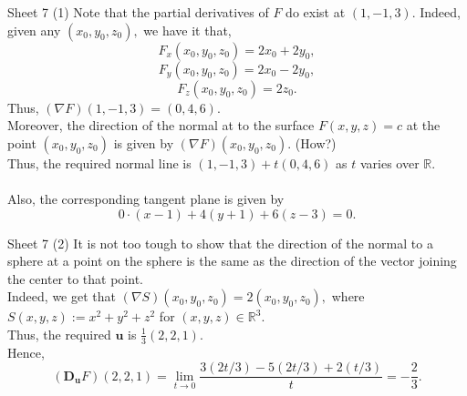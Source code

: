 \documentclass[handout, aspectratio=169]{beamer}
\begin{document}
\begin{frame}{Sheet 7}
	(1) Note that the partial derivatives of $F$ do exist at $(1, -1, 3).$ Indeed, given any $(x_0, y_0, z_0),$ we have it that,
	\[F_x(x_0, y_0, z_0) = 2x_0 + 2y_0,\]
	\[F_y(x_0, y_0, z_0) = 2x_0 - 2y_0,\]
	\[F_z(x_0, y_0, z_0) = 2z_0.\]
	Thus, $(\nabla F)(1, -1, 3) = (0, 4, 6).$ \\
	Moreover, the direction of the normal at to the surface $F(x, y, z) = c$ at the point $(x_0, y_0, z_0)$ is given by $(\nabla F)(x_0, y_0, z_0).$ \hfill (How?)\\
	Thus, the required normal line is $(1, -1, 3) + t(0, 4, 6)$ as $t$ varies over $\mathbb{R}.$\\~\\
	Also, the corresponding tangent plane is given by
	\[0\cdot(x - 1) + 4(y + 1) + 6(z - 3) = 0.\]
\end{frame}

\begin{frame}{Sheet 7}
	(2) It is not too tough to show that the direction of the normal to a sphere at a point on the sphere is the same as the direction of the vector joining the center to that point.\\
	Indeed, we get that $(\nabla S)(x_0, y_0, z_0) = 2(x_0, y_0, z_0),$ where $S(x, y, z) := x^2 + y^2 + z^2$ for $(x, y, z) \in \mathbb{R}^3.$\\
	Thus, the required $\mathbf{u}$ is $\frac{1}{3}(2, 2, 1).$\\
	Hence,
	\[(\mathbf{D_u}F)(2, 2, 1) = \lim_{t\to 0}\frac{3(2t/3) - 5(2t/3) + 2(t/3)}{t} = -\frac{2}{3}.\]
\end{frame}
\end{document}
